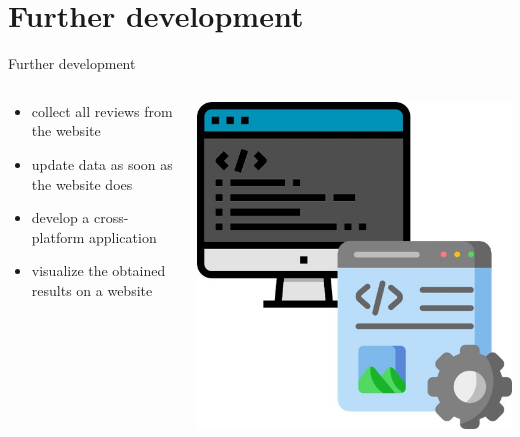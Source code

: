 \section{Further development}
\begin{frame}{Further development}
\hfill
\begin{columns}
\begin{column}{0.6\textwidth}
\begin{itemize}
    \item collect all reviews from the website  
    \item update data as soon as the website does
    \item develop a cross-platform application
    \item visualize	the	obtained results on	a website
\end{itemize}
\end{column}
\begin{column}{0.4\textwidth}
\includegraphics[width=0.5\linewidth]{Logos and Figures/Computer.jpg}
\end{column}
\end{columns}
\end{frame}